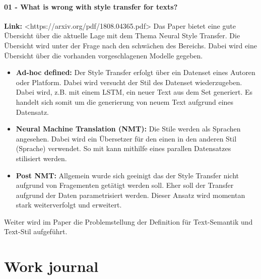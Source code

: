 \subsubsection{01 - What is wrong with style transfer for texts?}
\textbf{Link: } <https://arxiv.org/pdf/1808.04365.pdf>
\newline
\newline
Das Paper bietet eine gute Übersicht über die aktuelle Lage mit dem Thema Neural Style Transfer. Die Übersicht wird
unter der Frage nach den schwächen des Bereichs.
\newline
\newline
Dabei wird eine Übersicht über die vorhanden vorgeschlagenen Modelle gegeben.
\begin{itemize}
    \item \textbf{Ad-hoc defined:} Der Style Transfer erfolgt über ein Datenset eines Autoren oder Platform. Dabei wird
    versucht der Stil des Datenset wiederzugeben. Dabei wird, z.B. mit einem LSTM, ein neuer Text aus dem Set generiert.
    Es handelt sich somit um die generierung von neuem Text aufgrund eines Datensatz.
    \item \textbf{Neural Machine Translation (NMT):} Die Stile werden als Sprachen angesehen. Dabei wird ein Übersetzer
    für den einen in den anderen Stil (Sprache) verwendet. So mit kann mithilfe eines parallen Datensatzes stilisiert
    werden.
    \item \textbf{Post NMT:} Allgemein wurde sich geeinigt das der Style Transfer nicht aufgrund von Fragementen
    getätigt werden soll. Eher soll der Transfer aufgrund der Daten parametrisiert werden. Dieser Ansatz wird momentan
    stark weiterverfolgt und erweitert.
\end{itemize}
Weiter wird im Paper die Problemstellung der Definition für Text-Semantik und Text-Stil aufgeführt.

\chapter{Work journal}
\label{ch:Work-Journal}
